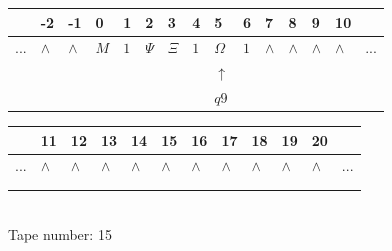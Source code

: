 \documentclass[11pt]{article}
\begin{document}
\begin{table}[H]
\centering
\begin{tabular}{lllllllllllllll}
 & -2 & -1 & 0 & 1 & 2 & 3 & 4 & 5 & 6 & 7 & 8 & 9 & 10 & \\
\hline
$...$ & \multicolumn{1}{|l|}{$\wedge$} & \multicolumn{1}{|l|}{$\wedge$} & \multicolumn{1}{|l|}{$M$} & \multicolumn{1}{|l|}{$1$} & \multicolumn{1}{|l|}{$\Psi$} & \multicolumn{1}{|l|}{$\Xi$} & \multicolumn{1}{|l|}{$1$} & \multicolumn{1}{|l|}{$\Omega$} & \multicolumn{1}{|l|}{$1$} & \multicolumn{1}{|l|}{$\wedge$} & \multicolumn{1}{|l|}{$\wedge$} & \multicolumn{1}{|l|}{$\wedge$} & \multicolumn{1}{|l|}{$\wedge$} & $...$\\
\hline
&  &  &  &  &  &  &  & $\uparrow$ &  &  &  &  &  &  \\
&  &  &  &  &  &  &  & $ q9 $ &  &  &  &  &  &  \\
\end{tabular}
\begin{tabular}{llllllllllll}
 & 11 & 12 & 13 & 14 & 15 & 16 & 17 & 18 & 19 & 20 & \\
\hline
$...$ & \multicolumn{1}{|l|}{$\wedge$} & \multicolumn{1}{|l|}{$\wedge$} & \multicolumn{1}{|l|}{$\wedge$} & \multicolumn{1}{|l|}{$\wedge$} & \multicolumn{1}{|l|}{$\wedge$} & \multicolumn{1}{|l|}{$\wedge$} & \multicolumn{1}{|l|}{$\wedge$} & \multicolumn{1}{|l|}{$\wedge$} & \multicolumn{1}{|l|}{$\wedge$} & \multicolumn{1}{|l|}{$\wedge$} & $...$\\
\hline
&  &  &  &  &  &  &  &  &  &  &  \\
&  &  &  &  &  &  &  &  &  &  &  \\
\end{tabular}
\\
Tape number: 15
\noindent\makebox[\linewidth]{\hdashrule{\textwidth}{1pt}{1pt}}\end{table}
\clearpage
\end{document}
